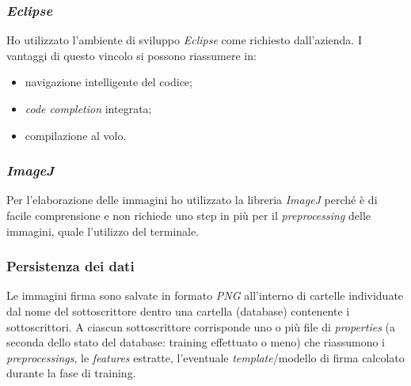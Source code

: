\subsubsection*{\emph{Eclipse}}
\label{3.3.3.2}
Ho utilizzato l'ambiente di sviluppo \emph{Eclipse} come richiesto dall'azienda. I vantaggi di questo vincolo si possono riassumere in:
\begin{itemize}
\item navigazione intelligente del codice;
\item \emph{code completion} integrata;
\item compilazione al volo.
\end{itemize}

\subsubsection*{\emph{ImageJ}}
\label{3.3.3.3}
Per l'elaborazione delle immagini ho utilizzato la libreria \emph{ImageJ} perché è di facile comprensione e non richiede uno step in più per il \emph{preprocessing} delle immagini, quale l'utilizzo del terminale.

\subsubsection*{Persistenza dei dati}
\label{3.3.3.4}
Le immagini firma sono salvate in formato \emph{PNG} all'interno di cartelle individuate dal nome del sottoscrittore dentro una cartella (database) contenente i sottoscrittori. A ciascun sottoscrittore corrisponde uno o più file di \emph{properties} (a seconda dello stato del database: training effettuato o meno) che riassumono i \emph{preprocessings}, le \emph{features} estratte, l'eventuale \emph{template}/modello di firma calcolato durante la fase di training.
